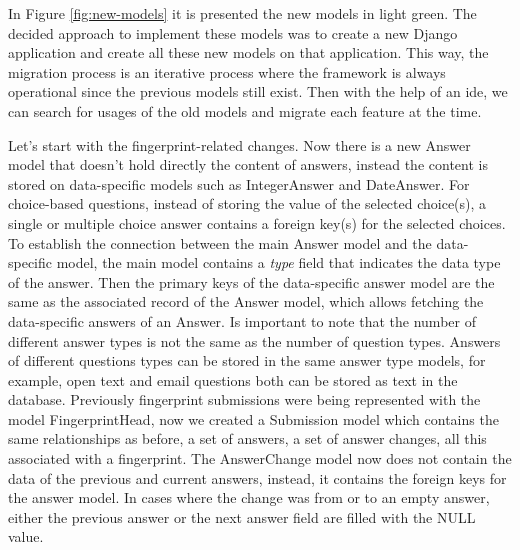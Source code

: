 In Figure \ref{fig:new-models} it is presented the new models in light green.
The decided approach to implement these models was to create a new Django application and create all these new models on that application.
This way, the migration process is an iterative process where the framework is always operational since the previous models still exist.
Then with the help of an \gls{ide}, we can search for usages of the old models and migrate each feature at the time.

Let's start with the fingerprint-related changes.
Now there is a new Answer model that doesn't hold directly the content of answers, instead the content is stored on data-specific models such as IntegerAnswer and DateAnswer.
For choice-based questions, instead of storing the value of the selected choice(s), a single or multiple choice answer contains a foreign key(s) for the selected choices.
To establish the connection between the main Answer model and the data-specific model, the main model contains a \textit{type} field that indicates the data type of the answer.
Then the primary keys of the data-specific answer model are the same as the associated record of the Answer model, which allows fetching the data-specific answers of an Answer.
Is important to note that the number of different answer types is not the same as the number of question types.
Answers of different questions types can be stored in the same answer type models, for example, open text and email questions both can be stored as text in the database.
Previously fingerprint submissions were being represented with the model FingerprintHead, now we created a Submission model which contains the same relationships as before, a set of answers, a set of answer changes, all this associated with a fingerprint.
The AnswerChange model now does not contain the data of the previous and current answers, instead, it contains the foreign keys for the answer model.
In cases where the change was from or to an empty answer, either the previous answer or the next answer field are filled with the NULL value.

